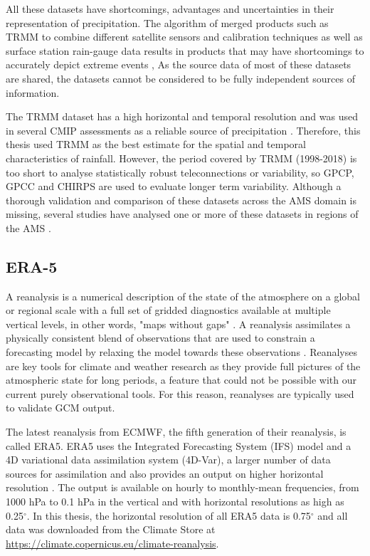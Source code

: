 All these datasets have shortcomings, advantages and uncertainties in their representation of precipitation. The algorithm of merged products such as TRMM to combine different satellite sensors and calibration techniques as well as surface station rain-gauge data results in products that may have shortcomings to accurately depict extreme events \citep{trejo2016}, 
As the source data of most of these datasets are shared, the datasets cannot be considered to be fully independent sources of information. 

The TRMM dataset has a high horizontal and temporal resolution and was used in several CMIP assessments \citep{geil2013,jones2013} as a reliable source of precipitation \citep{carvalho2012}. Therefore, this thesis used TRMM as the best estimate for the spatial and temporal characteristics of rainfall. However,
 the period covered by TRMM (1998-2018) is too short to analyse statistically robust teleconnections or variability, so GPCP, GPCC and CHIRPS are used to evaluate longer term variability.
 Although a thorough validation and comparison of these datasets across the AMS domain is missing, several studies have analysed  one or more of these datasets in regions of the AMS \citep[e.g.][]{franchito2009,dinku2010,trejo2016}.


\subsection{ERA-5}


A reanalysis is a numerical description of the state of the atmosphere on a global or regional scale with a full set of gridded diagnostics available at multiple vertical levels, in other words, "maps without gaps" \citep{era5hersbach}. A reanalysis assimilates a physically consistent blend of observations that are used to constrain a forecasting model by relaxing the model towards these observations \citep[e.g.][]{fujiwara2021}.
Reanalyses are key tools for climate and weather research as they provide full pictures of the atmospheric state for long periods, a feature that could not be possible with our current purely observational tools. For this reason, reanalyses are typically used to validate GCM output. 

The latest reanalysis from ECMWF, the fifth generation of their reanalysis, is called ERA5. 
ERA5 uses the Integrated Forecasting System (IFS) model and a 4D variational data assimilation system (4D-Var), a larger number of data sources for assimilation and also provides an output on higher horizontal resolution \citep{era5hersbach}. The output is available on hourly to monthly-mean frequencies, from 1000 hPa to 0.1 hPa in the vertical and with horizontal resolutions as high as 0.25$^\circ$. In this thesis, the horizontal resolution of all ERA5 data is 0.75$^\circ$ and all data was downloaded from the Climate Store at  \url{https://climate.copernicus.eu/climate-reanalysis}.

